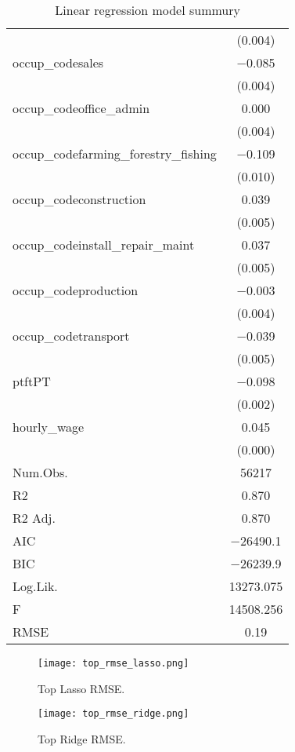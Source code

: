 \documentclass{article}
\begin{document}
\begin{table}
\begin{tabular}[t]{lc}
 & \vphantom{3} (\num{0.004})\\
occup\_codesales & \num{-0.085}\\
 & \vphantom{2} (\num{0.004})\\
occup\_codeoffice\_admin & \num{0.000}\\
 & \vphantom{1} (\num{0.004})\\
occup\_codefarming\_forestry\_fishing & \num{-0.109}\\
 & (\num{0.010})\\
occup\_codeconstruction & \num{0.039}\\
 & \vphantom{2} (\num{0.005})\\
occup\_codeinstall\_repair\_maint & \num{0.037}\\
 & \vphantom{1} (\num{0.005})\\
occup\_codeproduction & \num{-0.003}\\
& (\num{0.004})\\
occup\_codetransport & \num{-0.039}\\
 & (\num{0.005})\\
ptftPT & \num{-0.098}\\
 & (\num{0.002})\\
hourly\_wage & \num{0.045}\\
 & (\num{0.000})\\
\midrule
Num.Obs. & \num{56217}\\
R2 & \num{0.870}\\
R2 Adj. & \num{0.870}\\
AIC & \num{-26490.1}\\
BIC & \num{-26239.9}\\
Log.Lik. & \num{13273.075}\\
F & \num{14508.256}\\
RMSE & \num{0.19}\\
\bottomrule
\end{tabular}
\caption{\label{tab:widgets}Linear regression model summury}
\end{table}

\begin{figure}
\centering
\texttt{[image: top\_rmse\_lasso.png]}
\caption{\label{fig:frog} Top Lasso RMSE.}
\end{figure}

\begin{figure}
\centering
\texttt{[image: top\_rmse\_ridge.png]}
\caption{\label{fig:frog} Top Ridge RMSE.}
\end{figure}
\end{document}
